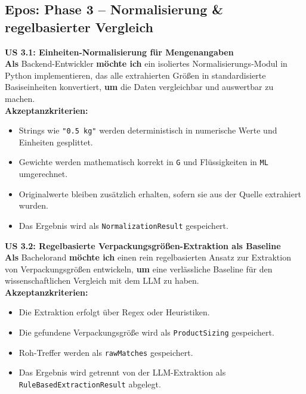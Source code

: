 \documentclass[11pt,a4paper]{article}
\begin{document}
\subsection{Epos: Phase 3 – Normalisierung \& regelbasierter Vergleich}

\noindent\colorbox{usgray}{%
\begin{minipage}{\dimexpr\textwidth-2\fboxsep\relax}
\textbf{\textcolor{usblue}{US 3.1: Einheiten-Normalisierung für Mengenangaben}} \\[0.5em]
\textbf{Als} Backend-Entwickler \textbf{möchte ich} ein isoliertes Normalisierungs-Modul in Python implementieren, das alle extrahierten Größen in standardisierte Basiseinheiten konvertiert, \textbf{um} die Daten vergleichbar und auswertbar zu machen.\\[0.5em]
\textbf{Akzeptanzkriterien:}
\begin{itemize}[leftmargin=*, parsep=0pt, topsep=0pt, itemsep=2pt]
    \item Strings wie \texttt{"0.5 kg"} werden deterministisch in numerische Werte und Einheiten gesplittet.
    \item Gewichte werden mathematisch korrekt in \texttt{G} und Flüssigkeiten in \texttt{ML} umgerechnet.
    \item Originalwerte bleiben zusätzlich erhalten, sofern sie aus der Quelle extrahiert wurden.
    \item Das Ergebnis wird als \texttt{NormalizationResult} gespeichert.
\end{itemize}
\end{minipage}}
\vspace{1em}

\noindent\colorbox{usgray}{%
\begin{minipage}{\dimexpr\textwidth-2\fboxsep\relax}
\textbf{\textcolor{usblue}{US 3.2: Regelbasierte Verpackungsgrößen-Extraktion als Baseline}} \\[0.5em]
\textbf{Als} Bachelorand \textbf{möchte ich} einen rein regelbasierten Ansatz zur Extraktion von Verpackungsgrößen entwickeln, \textbf{um} eine verlässliche Baseline für den wissenschaftlichen Vergleich mit dem LLM zu haben.\\[0.5em]
\textbf{Akzeptanzkriterien:}
\begin{itemize}[leftmargin=*, parsep=0pt, topsep=0pt, itemsep=2pt]
    \item Die Extraktion erfolgt über Regex oder Heuristiken.
    \item Die gefundene Verpackungsgröße wird als \texttt{ProductSizing} gespeichert.
    \item Roh-Treffer werden als \texttt{rawMatches} gespeichert.
    \item Das Ergebnis wird getrennt von der LLM-Extraktion als \texttt{RuleBasedExtractionResult} abgelegt.
\end{itemize}
\end{minipage}}
\vspace{1em}
\end{document}
